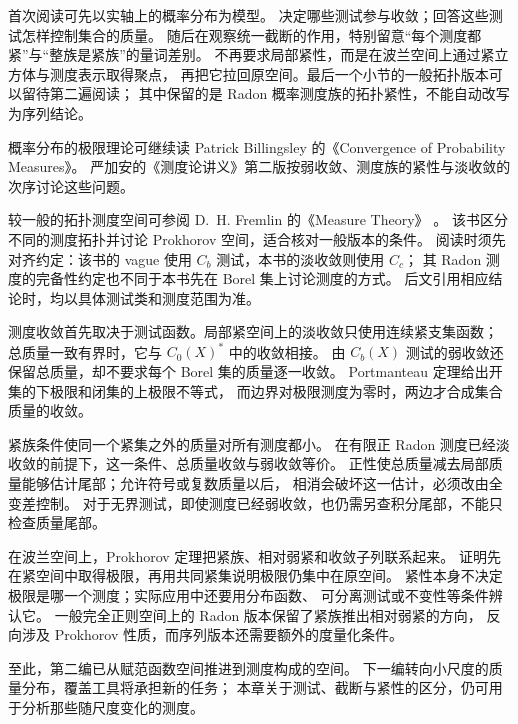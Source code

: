 \ProseParagraphBreak

首次阅读可先以实轴上的概率分布为模型。
决定哪些测试参与收敛；回答这些测试怎样控制集合的质量。
随后在观察统一截断的作用，特别留意“每个测度都紧”与“整族是紧族”的量词差别。
不再要求局部紧性，而是在波兰空间上通过紧立方体与测度表示取得聚点，
再把它拉回原空间。最后一个小节的一般拓扑版本可以留待第二遍阅读；
其中保留的是 Radon 概率测度族的拓扑紧性，不能自动改写为序列结论。

\ProseParagraphBreak

概率分布的极限理论可继续读 Patrick Billingsley 的《Convergence of Probability Measures》\cite[Second Edition]{Billingsley1999Convergence}。
严加安的《测度论讲义》第二版\cite[第6.2--6.5节]{Yan2004Cedulun}按弱收敛、测度族的紧性与淡收敛的次序讨论这些问题。

\ProseParagraphBreak

较一般的拓扑测度空间可参阅 D.~H. Fremlin 的《Measure Theory》%
\cite[Volume 4, 437J--P and 437U--V]{Fremlin2016Measure}。
该书区分不同的测度拓扑并讨论 Prokhorov 空间，适合核对一般版本的条件。
阅读时须先对齐约定：该书的 vague 使用 \(C_b\) 测试，本书的淡收敛则使用 \(C_c\)；
其 Radon 测度的完备性约定也不同于本书先在 Borel 集上讨论测度的方式。
后文引用相应结论时，均以具体测试类和测度范围为准。






\begin{chaptersummary}
测度收敛首先取决于测试函数。局部紧空间上的淡收敛只使用连续紧支集函数；
总质量一致有界时，它与 \(C_0(X)^*\) 中的\WeakStar{}收敛相接。
由 \(C_b(X)\) 测试的弱收敛还保留总质量，却不要求每个 Borel 集的质量逐一收敛。
Portmanteau 定理给出开集的下极限和闭集的上极限不等式，
而边界对极限测度为零时，两边才合成集合质量的收敛。

\ProseParagraphBreak

紧族条件使同一个紧集之外的质量对所有测度都小。
在有限正 Radon 测度已经淡收敛的前提下，这一条件、总质量收敛与弱收敛等价。
正性使总质量减去局部质量能够估计尾部；允许符号或复数质量以后，
相消会破坏这一估计，必须改由全变差控制。
对于无界测试，即使测度已经弱收敛，也仍需另查积分尾部，不能只检查质量尾部。

\ProseParagraphBreak

在波兰空间上，Prokhorov 定理把紧族、相对弱紧和收敛子列联系起来。
证明先在紧空间中取得极限，再用共同紧集说明极限仍集中在原空间。
紧性本身不决定极限是哪一个测度；实际应用中还要用分布函数、
可分离测试或不变性等条件辨认它。
一般完全正则空间上的 Radon 版本保留了紧族推出相对弱紧的方向，
反向涉及 Prokhorov 性质，而序列版本还需要额外的度量化条件。

\ProseParagraphBreak

至此，第二编已从赋范函数空间推进到测度构成的空间。
下一编转向小尺度的质量分布，覆盖工具将承担新的任务；
本章关于测试、截断与紧性的区分，仍可用于分析那些随尺度变化的测度。
\end{chaptersummary}

